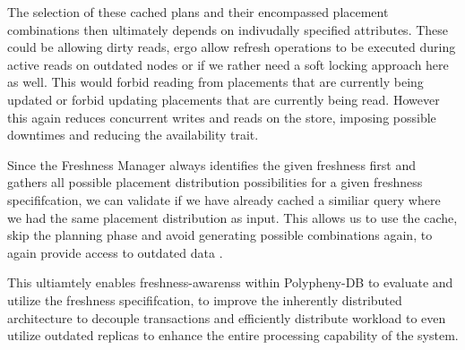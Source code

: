 The selection of these cached plans and their encompassed placement combinations then ultimately depends on indivudally specified attributes.
These could be allowing dirty reads, ergo allow refresh operations to be executed during active reads on outdated nodes or if we rather need a soft 
locking approach here as well. This would forbid reading from placements that are currently being updated or forbid updating placements that are currently being read.
However this again reduces concurrent writes and reads on the store, imposing possible downtimes and reducing the availability trait.

Since the Freshness Manager always identifies the given freshness first and gathers all possible placement distribution possibilities for a given freshness specififcation, 
we can validate if we have already cached a similiar query where we had the same placement distribution as input. 
This allows us to use the cache, skip the planning phase and avoid generating possible combinations again, to again provide access to outdated data . 

This ultiamtely enables freshness-awarenss within Polypheny-DB to evaluate and utilize the freshness specififcation, to improve the inherently distributed 
architecture to decouple transactions and efficiently distribute workload to even utilize outdated replicas to enhance the entire processing capability of the system.






